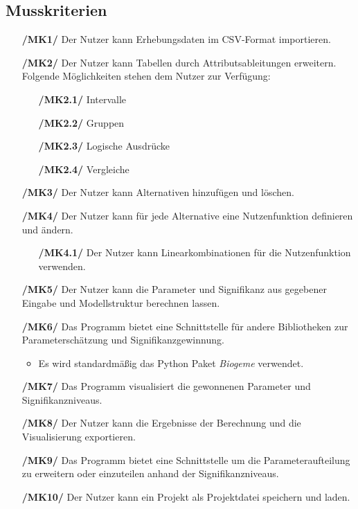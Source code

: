 \documentclass{article}
\begin{document}
\subsection{Musskriterien}
\begin{itemize}
    \item[\textbf{/MK1/}] Der Nutzer kann Erhebungsdaten im CSV-Format importieren.
    \item[\textbf{/MK2/}] Der Nutzer kann Tabellen durch Attributsableitungen erweitern.
    \subitem Folgende Möglichkeiten stehen dem Nutzer zur Verfügung:
    \begin{itemize}[leftmargin=.7in]
        \item[\textbf{/MK2.1/}] Intervalle
        \item[\textbf{/MK2.2/}] Gruppen
        \item[\textbf{/MK2.3/}] Logische Ausdrücke
        \item[\textbf{/MK2.4/}] Vergleiche
    \end{itemize}
    \item[\textbf{/MK3/}] Der Nutzer kann Alternativen hinzufügen und löschen.
    \item[\textbf{/MK4/}] Der Nutzer kann für jede Alternative eine Nutzenfunktion definieren und ändern.
    \begin{itemize}[leftmargin=.7in]
        \item[\textbf{/MK4.1/}] Der Nutzer kann Linearkombinationen für die Nutzenfunktion verwenden.
    \end{itemize}
    \item[\textbf{/MK5/}] Der Nutzer kann die Parameter und Signifikanz aus gegebener Eingabe und Modellstruktur berechnen lassen.
    \item[\textbf{/MK6/}] Das Programm bietet eine Schnittstelle für andere Bibliotheken zur Parameterschätzung und Signifikanzgewinnung. 
    \begin{itemize}
        \item Es wird standardmäßig das Python Paket \textit{Biogeme} verwendet.
    \end{itemize}
    \item[\textbf{/MK7/}] Das Programm visualisiert die gewonnenen Parameter und Signifikanzniveaus.
    \item[\textbf{/MK8/}] Der Nutzer kann die Ergebnisse der Berechnung und die Visualisierung exportieren.
    \item[\textbf{/MK9/}] Das Programm bietet eine Schnittstelle um die Parameteraufteilung zu erweitern oder einzuteilen anhand der Signifikanzniveaus.
    \item[\textbf{/MK10/}] Der Nutzer kann ein Projekt als Projektdatei speichern und laden.
\end{itemize}
\end{document}
